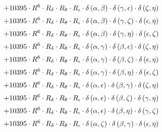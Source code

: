 \begin{subequations}
\begin{gather}
 \\[0.2em] \notag 		 + 10395 \cdot R^{6} \cdot R_{\delta{}} \cdot R_{\theta{}} \cdot R_{\iota{}} \cdot \delta{}\left(\alpha{}, \beta{}\right) \cdot \delta{}\left(\gamma{}, \epsilon{}\right) \cdot \delta{}\left(\zeta{}, \eta{}\right) 
 \\[0.2em] \notag 		 + 10395 \cdot R^{6} \cdot R_{\delta{}} \cdot R_{\theta{}} \cdot R_{\iota{}} \cdot \delta{}\left(\alpha{}, \beta{}\right) \cdot \delta{}\left(\gamma{}, \zeta{}\right) \cdot \delta{}\left(\epsilon{}, \eta{}\right) 
 \\[0.2em] \notag 		 + 10395 \cdot R^{6} \cdot R_{\delta{}} \cdot R_{\theta{}} \cdot R_{\iota{}} \cdot \delta{}\left(\alpha{}, \beta{}\right) \cdot \delta{}\left(\gamma{}, \eta{}\right) \cdot \delta{}\left(\epsilon{}, \zeta{}\right) 
 \\[0.2em] \notag 		 + 10395 \cdot R^{6} \cdot R_{\delta{}} \cdot R_{\theta{}} \cdot R_{\iota{}} \cdot \delta{}\left(\alpha{}, \gamma{}\right) \cdot \delta{}\left(\beta{}, \epsilon{}\right) \cdot \delta{}\left(\zeta{}, \eta{}\right) 
 \\[0.2em] \notag 		 + 10395 \cdot R^{6} \cdot R_{\delta{}} \cdot R_{\theta{}} \cdot R_{\iota{}} \cdot \delta{}\left(\alpha{}, \gamma{}\right) \cdot \delta{}\left(\beta{}, \zeta{}\right) \cdot \delta{}\left(\epsilon{}, \eta{}\right) 
 \\[0.2em] \notag 		 + 10395 \cdot R^{6} \cdot R_{\delta{}} \cdot R_{\theta{}} \cdot R_{\iota{}} \cdot \delta{}\left(\alpha{}, \gamma{}\right) \cdot \delta{}\left(\beta{}, \eta{}\right) \cdot \delta{}\left(\epsilon{}, \zeta{}\right) 
 \\[0.2em] \notag 		 + 10395 \cdot R^{6} \cdot R_{\delta{}} \cdot R_{\theta{}} \cdot R_{\iota{}} \cdot \delta{}\left(\alpha{}, \epsilon{}\right) \cdot \delta{}\left(\beta{}, \gamma{}\right) \cdot \delta{}\left(\zeta{}, \eta{}\right) 
 \\[0.2em] \notag 		 + 10395 \cdot R^{6} \cdot R_{\delta{}} \cdot R_{\theta{}} \cdot R_{\iota{}} \cdot \delta{}\left(\alpha{}, \epsilon{}\right) \cdot \delta{}\left(\beta{}, \zeta{}\right) \cdot \delta{}\left(\gamma{}, \eta{}\right) 
 \\[0.2em] \notag 		 + 10395 \cdot R^{6} \cdot R_{\delta{}} \cdot R_{\theta{}} \cdot R_{\iota{}} \cdot \delta{}\left(\alpha{}, \epsilon{}\right) \cdot \delta{}\left(\beta{}, \eta{}\right) \cdot \delta{}\left(\gamma{}, \zeta{}\right) 
 \\[0.2em] \notag 		 + 10395 \cdot R^{6} \cdot R_{\delta{}} \cdot R_{\theta{}} \cdot R_{\iota{}} \cdot \delta{}\left(\alpha{}, \zeta{}\right) \cdot \delta{}\left(\beta{}, \gamma{}\right) \cdot \delta{}\left(\epsilon{}, \eta{}\right) 

\end{gather}
\end{subequations}
